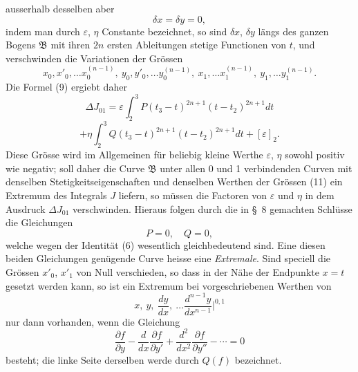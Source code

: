 \documentclass[11pt,a4paper,leqno]{article}
\begin{document}
ausserhalb desselben aber
\[
\delta x=\delta y=0,
\]
indem man durch $\varepsilon$, $\eta$ Constante bezeichnet, so sind $\delta x$, $\delta y$ längs des ganzen Bogens $\mathfrak B$ mit ihren $2n$ ersten Ableitungen stetige Functionen von $t$, und verschwinden die Variationen der Grössen
\begin{equation}\tag{11}
 x_0,x'_0,\ldots x_0^{(n-1)},\ y_0,y'_0,\ldots y_0^{(n-1)},\ x_1,\ldots x_1^{(n-1)},\ y_1,\ldots y_1^{(n-1)}.
\end{equation}
Die Formel (9) ergiebt daher
\[
\Delta J_{01}=\varepsilon\int_2^3P(t_3-t)^{2n+1}(t-t_2)^{2n+1}dt
\]
\[
+\eta\int_2^3Q(t_3-t)^{2n+1}(t-t_2)^{2n+1}dt+[\varepsilon]_2.
\]
Diese Grösse wird im Allgemeinen für beliebig kleine Werthe $\varepsilon$, $\eta$ sowohl positiv wie negativ; soll daher die Curve $\mathfrak B$ unter allen 0 und 1 verbindenden Curven mit denselben Stetigkeitseigenschaften und denselben Werthen der Grössen (11) ein Extremum des Integrals $J$ liefern, so müssen die Factoren von $\varepsilon$ und $\eta$ in dem Ausdruck $\Delta J_{01}$ verschwinden. Hieraus folgen durch die in \S~8 gemachten Schlüsse die Gleichungen
\[
P=0,\quad Q=0,
\]
welche wegen der Identität (6) wesentlich gleichbedeutend sind. Eine diesen beiden Gleichungen genügende Curve heisse eine \emph{Extremale}. Sind speciell die Grössen $x'_0$, $x'_1$ von Null verschieden, so dass in der Nähe der Endpunkte $x=t$ gesetzt werden kann, so ist ein Extremum bei vorgeschriebenen Werthen von
\[
x,\ y,\ \frac{dy}{dx},\ \ldots \frac{d^{n-1}y}{dx^{n-1}}\bigg|^{0,1}
\]
nur dann vorhanden, wenn die Gleichung
\[
\frac{\partial f}{\partial y}-\frac{d}{dx}\frac{\partial f}{\partial y'}+\frac{d^2}{dx^2}\frac{\partial f}{\partial y''}-\cdots=0
\]
besteht; die linke Seite derselben werde durch $Q(f)$ bezeichnet.
\end{document}
